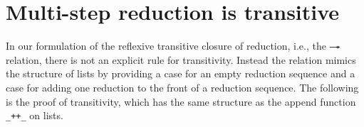 \begin{fence}
\begin{code}%
\>[0]\<%
\end{code}
\end{fence}

\hypertarget{multi-step-reduction-is-transitive}{%
\section{Multi-step reduction is
transitive}\label{multi-step-reduction-is-transitive}}

In our formulation of the reflexive transitive closure of reduction,
i.e., the \texttt{—↠} relation, there is not an explicit rule for
transitivity. Instead the relation mimics the structure of lists by
providing a case for an empty reduction sequence and a case for adding
one reduction to the front of a reduction sequence. The following is the
proof of transitivity, which has the same structure as the append
function \texttt{\_++\_} on lists.

\begin{fence}
\begin{code}%
\>[0]%
\>[1589I]\AgdaSymbol{:}\AgdaSpace{}%
\AgdaSymbol{\}\{}\AgdaSymbol{\}\{}\AgdaSpace{}%
\AgdaSpace{}%
\AgdaSpace{}%
\AgdaSymbol{:}\AgdaSpace{}%
\AgdaSpace{}%
\AgdaSpace{}%
\AgdaSymbol{\}}\<%
\\
\>[.][@{}l@{}]\<[1589I]%
\>[9]\AgdaSpace{}%
\AgdaSpace{}%
\AgdaSpace{}%
\<%
\\
%
\>[9]\AgdaSpace{}%
\AgdaSpace{}%
\AgdaSpace{}%
\<%
\\
%
\>[9]\AgdaSpace{}%
\AgdaSpace{}%
\AgdaSpace{}%
\<%
\\
\>[0]\AgdaSpace{}%
\AgdaSymbol{(}\AgdaSpace{}%
\AgdaSymbol{)}\AgdaSpace{}%
\AgdaSpace{}%
\AgdaSymbol{=}\AgdaSpace{}%
\<%
\\
\>[0]\AgdaSpace{}%
\AgdaSymbol{(}\AgdaSpace{}%
\AgdaSpace{}%
\AgdaSpace{}%
\AgdaSpace{}%
\AgdaSymbol{)}\AgdaSpace{}%
\AgdaSpace{}%
\AgdaSymbol{=}\AgdaSpace{}%
\AgdaSpace{}%
\AgdaSpace{}%
\AgdaSpace{}%
\AgdaSpace{}%
\AgdaSymbol{(}\AgdaSpace{}%
\AgdaSpace{}%
\AgdaSymbol{)}\<%
\end{code}
\end{fence}

